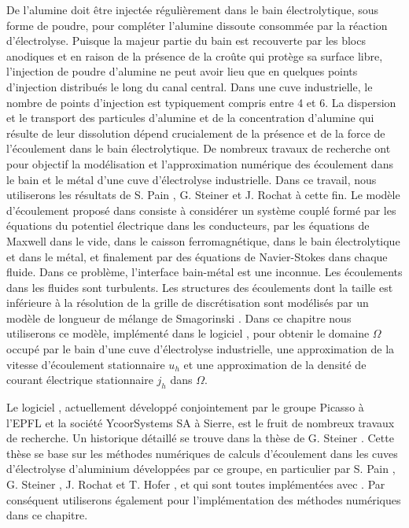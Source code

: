 De l'alumine doit être injectée régulièrement dans le bain
électrolytique, sous forme de poudre, pour compléter l'alumine
dissoute consommée par la réaction d'électrolyse. Puisque la majeur
partie du bain est recouverte par les blocs anodiques et en raison de
la présence de la croûte qui protège sa surface libre, l'injection de
poudre d'alumine ne peut avoir lieu que en quelques points d'injection
distribués le long du canal central. Dans une cuve industrielle, le
nombre de points d'injection est typiquement compris entre 4 et 6. La
dispersion et le transport des particules d'alumine et de la
concentration d'alumine qui résulte de leur dissolution dépend
crucialement de la présence et de la force de l'écoulement dans le
bain électrolytique. De nombreux travaux de recherche ont pour
objectif la modélisation et l'approximation numérique des écoulement
dans le bain et le métal d'une cuve d'électrolyse industrielle. Dans
ce travail, nous utiliserons les résultats de S. Pain \cite{Pain2006},
G. Steiner \cite{Steiner2009} et J. Rochat \cite{Rochat2016} à cette
fin. Le modèle d'écoulement proposé dans \cite{Steiner2009} consiste à
considérer un système couplé formé par les équations du potentiel
électrique dans les conducteurs, par les équations de Maxwell dans le
vide, dans le caisson ferromagnétique, dans le bain électrolytique et
dans le métal, et finalement par des équations de Navier-Stokes dans
chaque fluide. Dans ce problème, l'interface bain-métal est une
inconnue. Les écoulements dans les fluides sont turbulents. Les
structures des écoulements dont la taille est inférieure à la
résolution de la grille de discrétisation sont modélisés par un modèle
de longueur de mélange de Smagorinski \cite{Rochat2016}. Dans ce
chapitre nous utiliserons ce modèle, implémenté dans le logiciel
\citealucell{}, pour obtenir le domaine $\Omega$ occupé par le bain d'une
cuve d'électrolyse industrielle, une approximation de la vitesse
d'écoulement stationnaire $u_h$ et une approximation de la densité de
courant électrique stationnaire $j_h$ dans $\Omega$.

Le logiciel \alucell{}, actuellement développé conjointement par le
groupe Picasso à l'EPFL et la société YcoorSystems SA à Sierre, est le
fruit de nombreux travaux de recherche. Un historique détaillé se
trouve dans la thèse de G. Steiner \cite{Steiner2009}. Cette thèse se
base sur les méthodes numériques de calculs d'écoulement dans les
cuves d'électrolyse d'aluminium développées par ce groupe, en
particulier par S. Pain \cite{Pain2006}, G. Steiner
\cite{Steiner2009}, J. Rochat \cite{Rochat2016} et T. Hofer
\cite{Hofer2011}, et qui sont toutes implémentées avec \alucell{}. Par
conséquent utiliserons également \alucell{} pour l'implémentation des
méthodes numériques dans ce chapitre.

